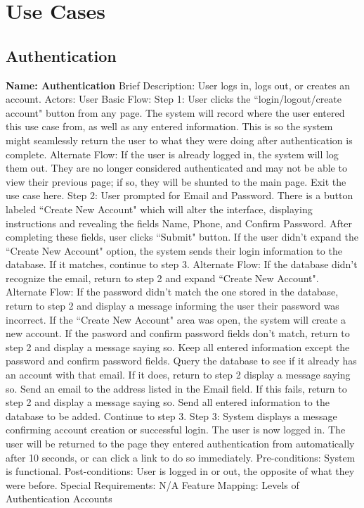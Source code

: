 \section{Use Cases}

\subsection{Authentication}
\begin{outline}[enumerate]

\1 {\bf Name: Authentication}
\2 Brief Description: User logs in, logs out, or creates an account.
\2 Actors: User
\2 Basic Flow:
\3 Step 1: User clicks the ``login/logout/create account" button from any page.
\4 The system will record where the user entered this use case from, as well as any entered information.  This is so the system might seamlessly return the user to what they were doing after authentication is complete.
\4 Alternate Flow: If the user is already logged in, the system will log them out.  They are no longer considered authenticated and may not be able to view their previous page; if so, they will be shunted to the main page.  Exit the use case here.
\3 Step 2: User prompted for Email and Password.  There is a button labeled ``Create New Account" which will alter the interface, displaying instructions and revealing the fields Name, Phone, and Confirm Password.  After completing these fields, user clicks ``Submit" button.
\4 If the user didn't expand the ``Create New Account" option, the system sends their login information to the database.  If it matches, continue to step 3.
\4 Alternate Flow: If the database didn't recognize the email, return to step 2 and expand ``Create New Account".
\4 Alternate Flow: If the password didn't match the one stored in the database, return to step 2 and display a message informing the user their password was incorrect.
\3 If the ``Create New Account" area was open, the system will create a new account.
\4 If the pasword and confirm password fields don't match, return to step 2 and display a message saying so.  Keep all entered information except the password and confirm password fields.
\4 Query the database to see if it already has an account with that email.  If it does, return to step 2 display a message saying so.
\4 Send an email to the address listed in the Email field.  If this fails, return to step 2 and display a message saying so.
\4 Send all entered information to the database to be added.  Continue to step 3.
\3 Step 3: System displays a message confirming account creation or successful login.  The user is now logged in.  The user will be returned to the page they entered authentication from automatically after 10 seconds, or can click a link to do so immediately.
\2 Pre-conditions:
\3 System is functional.
\2 Post-conditions:
\3 User is logged in or out, the opposite of what they were before.
\2 Special Requirements:
\3 N/A
\2 Feature Mapping:
\3 Levels of Authentication
\3 Accounts

\end{outline}

